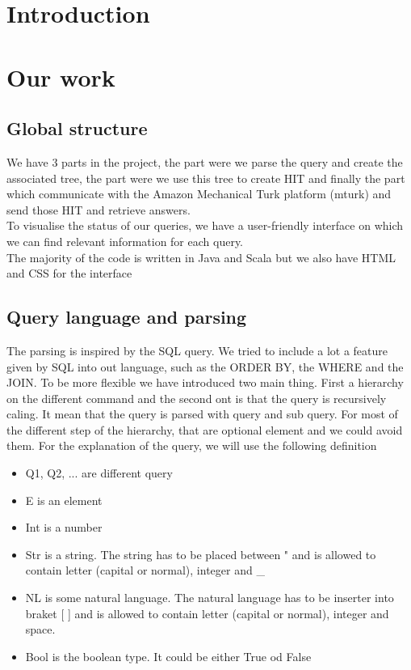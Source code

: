 \documentclass{article}
\begin{document}


\tableofcontents
\newpage


\section{Introduction}



\section{Our work} %
\subsection{Global structure}
We have 3 parts in the project, the part were we parse the query and create the associated tree, the part were we use this tree to create HIT and finally the part which communicate with the Amazon Mechanical Turk platform (mturk) and send those HIT and retrieve answers.\\
To visualise the status of our queries, we have a user-friendly interface on which we can find relevant information for each query.\\ The majority of the code is written in Java and Scala but we also have HTML and CSS for the interface
\subsection{Query language and parsing}
The parsing is inspired by the SQL query. We tried to include a lot a feature given by SQL into out language, such as the ORDER BY, the WHERE and the JOIN. To be more flexible we have introduced two main thing. First a hierarchy on the different command and the second ont is that the query is recursively caling. It mean that the query is parsed with query and sub query.
For most of the different step of the hierarchy, that are optional element and we could avoid them.
For the explanation of the query, we will use the following definition
\begin{itemize}
\item Q1, Q2, ... are different query
\item E is an element
\item Int is a number
\item Str is a string. The string has to be placed between " and is allowed to contain letter (capital or normal), integer and \_
\item NL is some natural language. The natural language has to be inserter into braket [ ] and is allowed to contain letter (capital or normal), integer and space.
\item Bool is the boolean type. It could be either True od False
\end{itemize}
\end{document}
